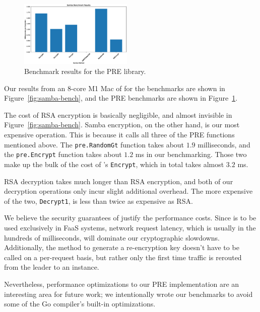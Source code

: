 \begin{figure}
	\centering
	\includegraphics[width=0.48\textwidth]{figs/pre-bench}
	\caption{Benchmark results for the PRE library.}
	\label{fig:pre-bench}
\end{figure}


Our results from an 8-core M1 Mac of for the \SystemName benchmarks are shown in Figure~\ref{fig:samba-bench}, and the PRE benchmarks are shown in Figure~\ref{fig:pre-bench}.

The cost of RSA encryption is basically negligible, and almost invisible in Figure~\ref{fig:samba-bench}. Samba encryption, on the other hand, is our most expensive operation.
This is because it calls all three of the PRE functions mentioned above. The \texttt{pre.RandomGt} function takes about $1.9$ milliseconds, and the \texttt{pre.Encrypt} function takes about $1.2$ ms in our benchmarking.
Those two make up the bulk of the cost of \SystemName's \texttt{Encrypt}, which in total takes almost $3.2$ ms. 

RSA decryption takes much longer than RSA encryption, and both of our \SystemName decryption operations only incur slight additional overhead. The more expensive of the two, \texttt{Decrypt1}, is less than twice as expensive as RSA.

We believe the security guarantees of \SystemName justify the performance costs.
Since \SystemName is to be used exclusively in FaaS systems, network request latency, which is usually in the hundreds of milliseconds, will dominate our cryptographic slowdowns.
Additionally, the method to generate a re-encryption key doesn't have to be called on a per-request basis, but rather only the first time traffic is rerouted from the leader to an instance.

Nevertheless, performance optimizations to our PRE implementation are an interesting area for future work; we intentionally wrote our benchmarks to avoid some of the Go compiler's built-in optimizations.


